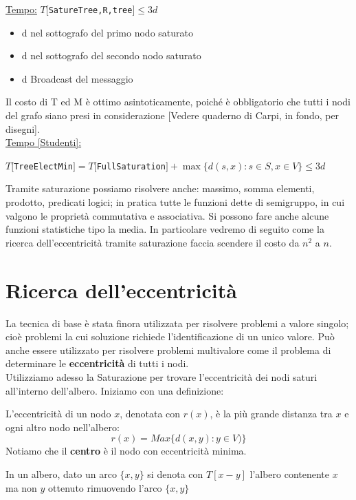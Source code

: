 \underline{Tempo:}
$T[$\texttt{SatureTree,R,tree}$] \leq 3d$
\begin{itemize}
    \item d nel sottografo del primo nodo saturato
    \item d nel sottografo del secondo nodo saturato
    \item d Broadcast del messaggio
\end{itemize}


Il costo di T ed M è ottimo asintoticamente, poiché è obbligatorio che tutti i
nodi del grafo siano presi in considerazione [Vedere quaderno di Carpi, in
        fondo, per disegni].\\
\underline{Tempo [Studenti]:}
\begin{center}
    $T[$\texttt{TreeElectMin}$] = T[$\texttt{FullSaturation}$] + \max \{ d(s, x) :
        s \in S, x \in V \} \leq 3d$
\end{center}

Tramite saturazione possiamo risolvere anche: massimo, somma elementi, prodotto,
predicati logici; in pratica tutte le funzioni dette di semigruppo, in cui
valgono le proprietà commutativa e associativa. Si possono fare anche alcune
funzioni statistiche tipo la media. In particolare vedremo di seguito come la
ricerca dell'eccentricità tramite saturazione faccia scendere il costo da $n^2$
a $n$.

\section{Ricerca dell'eccentricità}
La tecnica di base è stata finora utilizzata per risolvere problemi a valore
singolo; cioè problemi la cui soluzione richiede l'identificazione di un unico
valore. Può anche essere utilizzato per risolvere problemi multivalore come il
problema di determinare le \textbf{eccentricità} di tutti i nodi.\\
Utilizziamo adesso la Saturazione per trovare l'eccentricità dei nodi saturi
all'interno dell'albero. Iniziamo con una definizione:\\

\begin{definition}
    L'eccentricità di un nodo $x$, denotata con $r(x)$, è la più grande
    distanza tra $x$ e ogni altro nodo nell'albero: $$r(x) = Max\{d(x,y) : y \in
        V)\}$$ Notiamo che il \textbf{centro} è il nodo con eccentricità minima.
\end{definition}

\begin{definition}
    In un albero, dato un arco $\{x,y\}$ si denota con $T[x - y]$
    l'albero contenente $x$ ma non $y$ ottenuto rimuovendo l'arco $\{x,y\}$
\end{definition}

